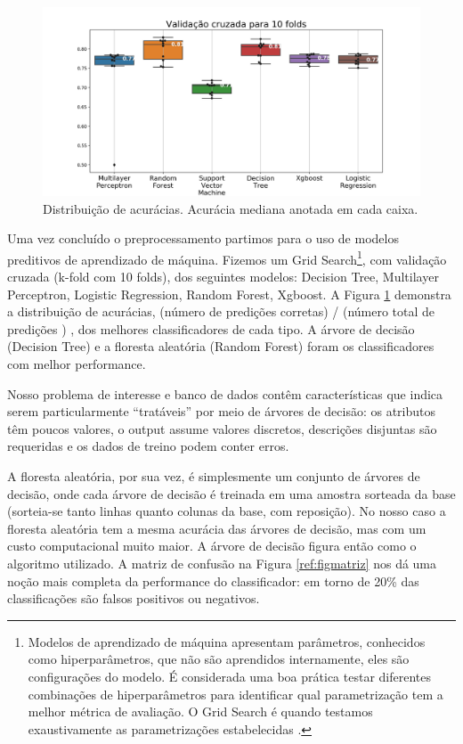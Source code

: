 \documentclass[
	12pt,				%
	openany,			%
	oneside,			%
	a4paper,			%
	english,			%
	french,				%
	spanish,			%
	brazil,				%
	]{abntex2}
\begin{document}
\begin{figure}[H]
  \includegraphics[scale=0.5]{img/cvs.png}
  \caption{Distribuição de acurácias. Acurácia mediana anotada em cada caixa.}
  \label{ref:figaccs}
\end{figure}

Uma vez concluído o preprocessamento partimos para o uso de modelos preditivos
de aprendizado de máquina. Fizemos um Grid Search\footnote{Modelos de
  aprendizado de máquina apresentam parâmetros, conhecidos como hiperparâmetros,
  que não são aprendidos internamente, eles são configura\c{c}ões do modelo. É
  considerada uma boa prática testar diferentes combinações de hiperparâmetros
  para identificar qual parametrização tem a melhor métrica de avaliação. O Grid
  Search é quando testamos exaustivamente as parametrizações estabelecidas
  \cite{geron2019hands}. }, com validação cruzada (k-fold com 10 folds), dos
seguintes modelos: Decision Tree, Multilayer Perceptron, Logistic Regression,
Random Forest, Xgboost. A Figura \ref{ref:figaccs} demonstra a distribuição de
acurácias, (número de predições corretas) / (número total de predições ) , dos
melhores classificadores de cada tipo. A árvore de decisão (Decision Tree) e a
floresta aleatória (Random Forest) foram os classificadores com melhor
performance.

Nosso problema de interesse e banco de dados contêm características que
 indica serem particularmente
``tratáveis'' por meio de árvores de decisão: os atributos têm poucos valores, o
output assume valores discretos, descri\c{c}ões disjuntas são requeridas e os
dados de treino podem conter erros.
  
A floresta aleatória, por sua vez, é simplesmente um conjunto de árvores de
decisão, onde cada árvore de decisão é treinada em uma amostra sorteada da base
(sorteia-se tanto linhas quanto colunas da base, com reposi\c{c}ão). No nosso
caso a floresta aleatória tem a mesma acurácia das árvores de decisão, mas com
um custo computacional muito maior. A árvore de decisão figura então como o
algoritmo utilizado. A matriz de confusão na Figura \ref{ref:figmatriz} nos dá
uma no\c{c}ão mais completa da performance do classificador: em torno de 20\%
das classifica\c{c}ões são falsos positivos ou negativos.
\end{document}
